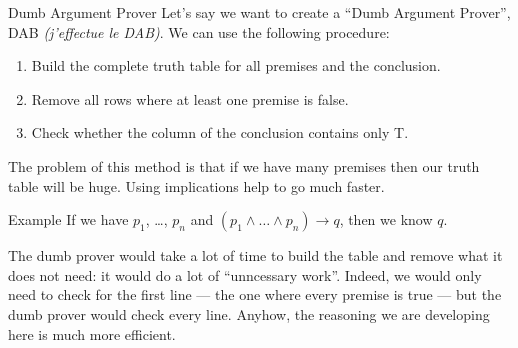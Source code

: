 \documentclass{article}
\begin{document}
\begin{parag}{Dumb Argument Prover}
    Let's say we want to create a ``Dumb Argument Prover'', DAB \textit{(j'effectue le DAB)}. We can use the following procedure:
    \begin{enumerate}
        \item Build the complete truth table for all premises and the conclusion.
        \item Remove all rows where at least one premise is false.
        \item Check whether the column of the conclusion contains only T.
    \end{enumerate}

    The problem of this method is that if we have many premises then our truth table will be huge. Using implications help to go much faster.

    \begin{subparag}{Example}
        If we have $p_1$, \ldots, $p_n$ and $\left(p_1 \land\ldots \land p_n\right) \to q$, then we know $q$.

        The dumb prover would take a lot of time to build the table and remove what it does not need: it would do a lot of ``unncessary work''. Indeed, we would only need to check for the first line --- the one where every premise is true --- but the dumb prover would check every line. Anyhow, the reasoning we are developing here is much more efficient.
    \end{subparag}

\end{parag}
\end{document}
